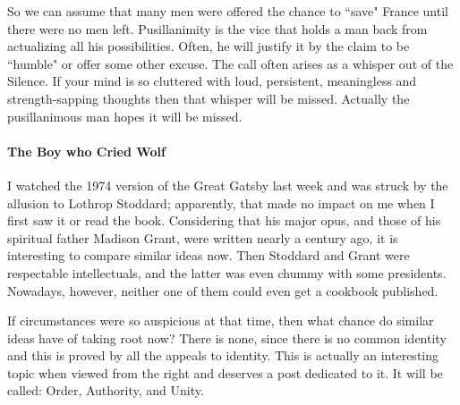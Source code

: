 So we can assume that many men were offered the chance to ``save" France until there were no men left. Pusillanimity is the vice that holds a man back from actualizing all his possibilities. Often, he will justify it by the claim to be ``humble" or offer some other excuse. The call often arises as a whisper out of the Silence. If your mind is so cluttered with loud, persistent, meaningless and strength-sapping thoughts then that whisper will be missed. Actually the pusillanimous man hopes it will be missed.

\paragraph{The Boy who Cried Wolf}
I watched the 1974 version of the Great Gatsby last week and was struck by the allusion to Lothrop Stoddard; apparently, that made no impact on me when I first saw it or read the book. Considering that his major opus, and those of his spiritual father Madison Grant, were written nearly a century ago, it is interesting to compare similar ideas now. Then Stoddard and Grant were respectable intellectuals, and the latter was even chummy with some presidents. Nowadays, however, neither one of them could even get a cookbook published.

If circumstances were so auspicious at that time, then what chance do similar ideas have of taking root now? There is none, since there is no common identity and this is proved by all the appeals to identity. This is actually an interesting topic when viewed from the right and deserves a post dedicated to it. It will be called: Order, Authority, and Unity.



